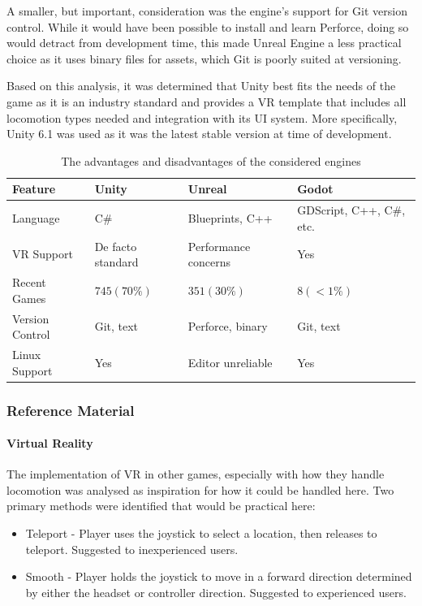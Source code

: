 \documentclass[sigconf,authordraft]{acmart}
\begin{document}
A smaller, but important, consideration was the engine's support for Git version
control. While it would have been possible to install and learn Perforce, doing
so would detract from development time, this made Unreal Engine a less practical
choice as it uses binary files for assets, which Git is poorly suited at
versioning.

Based on this analysis, it was determined that Unity best fits the needs of the
game as it is an industry standard and provides a VR template that includes all
locomotion types needed and integration with its UI system. More specifically,
Unity 6.1 was used as it was the latest stable version at time of development.

\begin{table}
  \caption{The advantages and disadvantages of the considered engines}
  \label{table:engine_compare}
  \begin{tabular}{llll}\toprule
    Feature & Unity & Unreal & Godot \\\midrule

    Language & C\# & Blueprints, C++ & GDScript, C++, C\#, etc. \\
    VR Support & De facto standard & Performance concerns & Yes \\
    Recent Games & $745 (70\%)$ & $351 (30\%)$ & $8 (<1\%)$ \\
    Version Control & Git, text & Perforce, binary & Git, text \\
    Linux Support & Yes & Editor unreliable & Yes \\

    \bottomrule
  \end{tabular}
\end{table}

\subsubsection{Reference Material}

\paragraph{Virtual Reality}
The implementation of VR in other games, especially with how they handle
locomotion was analysed as inspiration for how it could be handled here. Two
primary methods were identified that would be practical here:

\begin{itemize}
  \item Teleport - Player uses the joystick to select a location, then releases
    to teleport. Suggested to inexperienced users.
  \item Smooth - Player holds the joystick to move in a forward direction
    determined by either the headset or controller direction. Suggested to
    experienced users.
\end{itemize}
\end{document}
